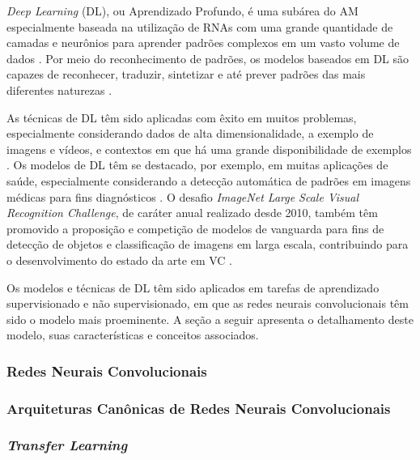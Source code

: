 \emph{Deep Learning} (DL), ou Aprendizado Profundo, é uma subárea do AM especialmente baseada na utilização de RNAs com uma grande quantidade de camadas e neurônios para aprender padrões complexos em um vasto volume de dados \cite{ref:chollet,ref:khan,ref:gulli}. Por meio do reconhecimento de padrões, os modelos baseados em DL são capazes de reconhecer, traduzir, sintetizar e até prever padrões das mais diferentes naturezas \cite{ref:JAI-2017}.

As técnicas de DL têm sido aplicadas com êxito em muitos problemas, especialmente considerando dados de alta dimensionalidade, a exemplo de imagens e vídeos, e contextos em que há uma grande disponibilidade de exemplos  \cite{ref:JAI-2017,ref:khan}. Os modelos de DL têm se destacado, por exemplo, em muitas aplicações de saúde, especialmente considerando a detecção automática de padrões em imagens médicas para fins diagnósticos \cite{ref:yang}. O desafio
\emph{ImageNet Large Scale Visual Recognition Challenge}, de caráter anual realizado desde 2010, também têm promovido a proposição e competição de modelos de vanguarda para fins de detecção de objetos e classificação de imagens em larga escala, contribuindo para o desenvolvimento do estado da arte em VC \cite{ref:image-net}.

Os modelos e técnicas de DL têm sido aplicados em tarefas de aprendizado supervisionado e não supervisionado, em que as redes neurais convolucionais têm sido o modelo mais proeminente. A seção a seguir apresenta o detalhamento deste modelo, suas características e conceitos associados.

\subsubsection{Redes Neurais Convolucionais} \label{subsec:cnn}


\subsubsection{Arquiteturas Canônicas de Redes Neurais Convolucionais} \label{subsubsec:arquiteturas}


\subsubsection{\textit{Transfer Learning}} \label{subsec:transfer}

